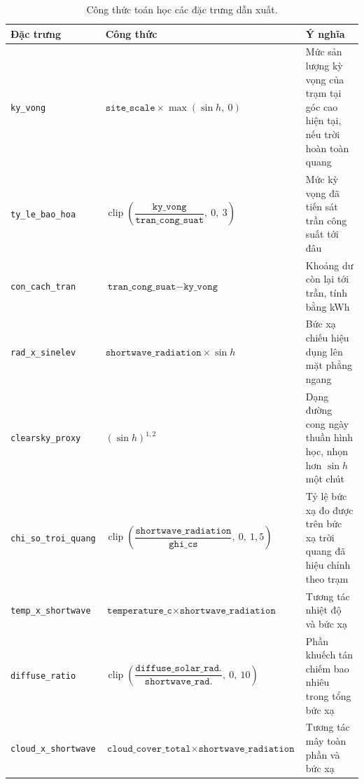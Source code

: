 \begin{table}[htbp]
\centering
\caption{Công thức toán học các đặc trưng dẫn xuất.}
\label{tab:dinh_nghia_dan_xuat}
\small
\begin{tabular}{@{}L{4.0cm} L{7.0cm} L{4.1cm}@{}}
\toprule
\textbf{Đặc trưng} & \textbf{Công thức} & \textbf{Ý nghĩa} \\
\midrule
\texttt{ky\_vong} &
$\texttt{site\_scale} \times \max(\sin h,\ 0)$ &
Mức sản lượng kỳ vọng của trạm tại góc cao hiện tại, nếu trời hoàn toàn quang \\
\addlinespace
\texttt{ty\_le\_bao\_hoa} &
$\operatorname{clip}\!\left(\dfrac{\texttt{ky\_vong}}{\texttt{tran\_cong\_suat}},\ 0,\ 3\right)$ &
Mức kỳ vọng đã tiến sát trần công suất tới đâu \\
\addlinespace
\texttt{con\_cach\_tran} &
$\texttt{tran\_cong\_suat} - \texttt{ky\_vong}$ &
Khoảng dư còn lại tới trần, tính bằng kWh \\
\addlinespace
\texttt{rad\_x\_sinelev} &
$\texttt{shortwave\_radiation} \times \sin h$ &
Bức xạ chiếu hiệu dụng lên mặt phẳng ngang \\
\addlinespace
\texttt{clearsky\_proxy} &
$(\sin h)^{1{,}2}$ &
Dạng đường cong ngày thuần hình học, nhọn hơn $\sin h$ một chút \\
\addlinespace
\texttt{chi\_so\_troi\_quang} &
$\operatorname{clip}\!\left(\dfrac{\texttt{shortwave\_radiation}}{\texttt{ghi\_cs}},\ 0,\ 1{,}5\right)$ &
Tỷ lệ bức xạ đo được trên bức xạ trời quang đã hiệu chỉnh theo trạm \\
\addlinespace
\texttt{temp\_x\_shortwave} &
$\texttt{temperature\_c} \times \texttt{shortwave\_radiation}$ &
Tương tác nhiệt độ và bức xạ \\
\addlinespace
\texttt{diffuse\_ratio} &
$\operatorname{clip}\!\left(\dfrac{\texttt{diffuse\_solar\_rad.}}{\texttt{shortwave\_rad.}},\ 0,\ 10\right)$ &
Phần khuếch tán chiếm bao nhiêu trong tổng bức xạ \\
\addlinespace
\texttt{cloud\_x\_shortwave} &
$\texttt{cloud\_cover\_total} \times \texttt{shortwave\_radiation}$ &
Tương tác mây toàn phần và bức xạ \\
\bottomrule
\end{tabular}
\end{table}

